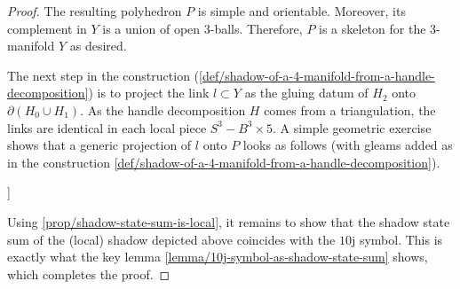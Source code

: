 \begin{proof}
  The resulting polyhedron $P$ is simple and orientable.
  Moreover, its complement in $Y$ is a union of open $3$-balls.
  Therefore, $P$ is a skeleton for the $3$-manifold $Y$ as
  desired.

  The next step in the construction
  (\ref{def/shadow-of-a-4-manifold-from-a-handle-decomposition}) is
  to project the link $l \subset Y$ as the gluing datum of
  $H_{2}$ onto $\partial(H_{0} \cup H_{1})$. As the handle
  decomposition $H$ comes from a triangulation, the links are
  identical in each local piece $S^{3} - B^{3} \times 5$. A
  simple geometric exercise shows that a generic projection of
  $l$ onto $P$ looks as follows (with gleams added as in the
  construction
  \ref{def/shadow-of-a-4-manifold-from-a-handle-decomposition}).

  \noindent [TODO: Add graphic [20220217T143000 (1)]]

  Using \ref{prop/shadow-state-sum-is-local}, it remains to show
  that the shadow state sum of the (local) shadow depicted above
  coincides with the $10$j symbol. This is exactly what the key
  lemma \ref{lemma/10j-symbol-as-shadow-state-sum} shows, which completes the proof.
\end{proof}
